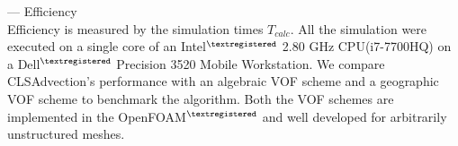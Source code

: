 --- Efficiency\\
Efficiency is measured by the simulation times $T_{calc}$. All the simulation were executed on a single core of an Intel$^{\textregistered}$ 2.80 GHz CPU(i7-7700HQ) on a Dell$^{\textregistered}$ Precision 3520 Mobile Workstation.
We compare CLSAdvection's performance with an algebraic VOF scheme\citep{deshpande2012evaluating} and a geographic VOF scheme\citep{roenby2016computational} to benchmark the algorithm. Both the VOF schemes are implemented in the OpenFOAM$^{\textregistered}$ and well developed for arbitrarily unstructured meshes.

%

